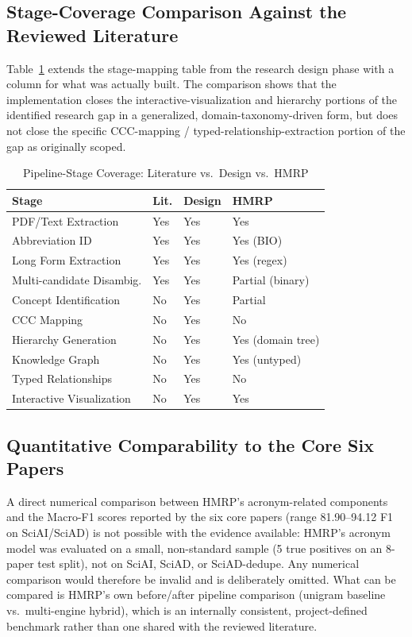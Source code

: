 \documentclass[10pt,conference]{IEEEtran}
\begin{document}
\subsection{Stage-Coverage Comparison Against the Reviewed Literature}
Table~\ref{tab:coverage} extends the stage-mapping table from the research design phase with a column for what was actually built. The comparison shows that the implementation closes the interactive-visualization and hierarchy portions of the identified research gap in a generalized, domain-taxonomy-driven form, but does not close the specific CCC-mapping / typed-relationship-extraction portion of the gap as originally scoped.

\begin{table}[t]
\caption{Pipeline-Stage Coverage: Literature vs.\ Design vs.\ HMRP}
\label{tab:coverage}
\centering
\small
\begin{tabular}{@{}p{}p{}p{}p{}@{}}
\toprule
\textbf{Stage} & \textbf{Lit.} & \textbf{Design} & \textbf{HMRP} \\
\midrule
PDF/Text Extraction & Yes & Yes & Yes \\
Abbreviation ID & Yes & Yes & Yes (BIO) \\
Long Form Extraction & Yes & Yes & Yes (regex) \\
Multi-candidate Disambig. & Yes & Yes & Partial (binary) \\
Concept Identification & No & Yes & Partial \\
CCC Mapping & No & Yes & No \\
Hierarchy Generation & No & Yes & Yes (domain tree) \\
Knowledge Graph & No & Yes & Yes (untyped) \\
Typed Relationships & No & Yes & No \\
Interactive Visualization & No & Yes & Yes \\
\bottomrule
\end{tabular}
\end{table}

\subsection{Quantitative Comparability to the Core Six Papers}
A direct numerical comparison between HMRP's acronym-related components and the Macro-F1 scores reported by the six core papers (range 81.90--94.12 F1 on SciAI/SciAD) is not possible with the evidence available: HMRP's acronym model was evaluated on a small, non-standard sample (5 true positives on an 8-paper test split), not on SciAI, SciAD, or SciAD-dedupe. Any numerical comparison would therefore be invalid and is deliberately omitted. What can be compared is HMRP's own before/after pipeline comparison (unigram baseline vs.\ multi-engine hybrid), which is an internally consistent, project-defined benchmark rather than one shared with the reviewed literature.
\end{document}
